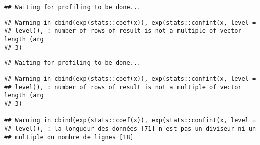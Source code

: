 \documentclass[]{article}
\newenvironment{Shaded}{\begin{snugshade}}{\end{snugshade}}
\newcommand{\KeywordTok}[1]{\textcolor[rgb]{0.13,0.29,0.53}{\textbf{#1}}}
\newcommand{\DataTypeTok}[1]{\textcolor[rgb]{0.13,0.29,0.53}{#1}}
\newcommand{\StringTok}[1]{\textcolor[rgb]{0.31,0.60,0.02}{#1}}
\newcommand{\OperatorTok}[1]{\textcolor[rgb]{0.81,0.36,0.00}{\textbf{#1}}}
\newcommand{\NormalTok}[1]{#1}
\begin{document}
\begin{verbatim}
## Waiting for profiling to be done...
\end{verbatim}

\begin{verbatim}
## Warning in cbind(exp(stats::coef(x)), exp(stats::confint(x, level =
## level)), : number of rows of result is not a multiple of vector length (arg
## 3)
\end{verbatim}

\begin{verbatim}
## Waiting for profiling to be done...
\end{verbatim}

\begin{verbatim}
## Warning in cbind(exp(stats::coef(x)), exp(stats::confint(x, level =
## level)), : number of rows of result is not a multiple of vector length (arg
## 3)

## Warning in cbind(exp(stats::coef(x)), exp(stats::confint(x, level =
## level)), : la longueur des données [71] n'est pas un diviseur ni un
## multiple du nombre de lignes [18]
\end{verbatim}

\begin{Shaded}
\end{Shaded}
\end{document}
